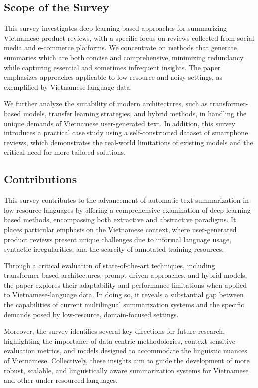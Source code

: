\documentclass{article}
\begin{document}
\subsection{Scope of the Survey}
This survey investigates deep learning-based approaches for summarizing Vietnamese product reviews, with a specific focus on reviews collected from social media and e-commerce platforms. We concentrate on methods that generate summaries which are both concise and comprehensive, minimizing redundancy while capturing essential and sometimes infrequent insights. The paper emphasizes approaches applicable to low-resource and noisy settings, as exemplified by Vietnamese language data.

We further analyze the suitability of modern architectures, such as transformer-based models, transfer learning strategies, and hybrid methods, in handling the unique demands of Vietnamese user-generated text. In addition, this survey introduces a practical case study using a self-constructed dataset of smartphone reviews, which demonstrates the real-world limitations of existing models and the critical need for more tailored solutions.

\subsection{Contributions}
This survey contributes to the advancement of automatic text summarization in low-resource languages by offering a comprehensive examination of deep learning-based methods, encompassing both extractive and abstractive paradigms. It places particular emphasis on the Vietnamese context, where user-generated product reviews present unique challenges due to informal language usage, syntactic irregularities, and the scarcity of annotated training resources.

Through a critical evaluation of state-of-the-art techniques, including transformer-based architectures, prompt-driven approaches, and hybrid models, the paper explores their adaptability and performance limitations when applied to Vietnamese-language data. In doing so, it reveals a substantial gap between the capabilities of current multilingual summarization systems and the specific demands posed by low-resource, domain-focused settings.

Moreover, the survey identifies several key directions for future research, highlighting the importance of data-centric methodologies, context-sensitive evaluation metrics, and models designed to accommodate the linguistic nuances of Vietnamese. Collectively, these insights aim to guide the development of more robust, scalable, and linguistically aware summarization systems for Vietnamese and other under-resourced languages.
\end{document}
